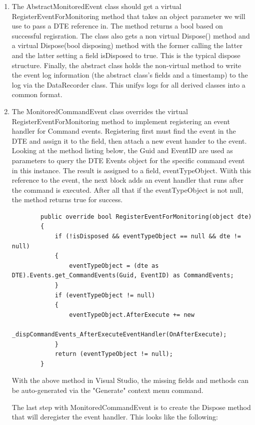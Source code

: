\begin{enumerate}
\item
The AbstractMonitoredEvent class should get a virtual RegisterEventForMonitoring method that takes an object parameter we will use to pass a DTE reference in.  The method returns a bool based on successful regisration.  The class also gets a non virtual Dispose() method  and a virtual Dispose(bool disposing) method with the former calling the latter and the latter setting a field isDisposed to true. This is the typical dispose structure.  Finally, the abstract class holds the non-virtual method to write the event log information (the abstract class's fields and a timestamp) to the log via the DataRecorder class.  This unifys logs for all derived classes into a common format.

\item
The MonitoredCommandEvent class overrides the virtual RegisterEventForMonitoring method to implement registering an event handler for Command events.  Registering first must find the event in the DTE and assign it to the field, then attach a new event hander to the event.  Looking at the method listing below, the Guid and EventID are used as parameters to query the DTE Events object for the specific command event in this instance.  The result is assigned to a field, eventTypeObject.  Wiith this reference to the event, the next block adds an event handler that runs after the command is executed.  After all that if the eventTypeObject is not null, the method returns true for success.
\begin{lstlisting}
        public override bool RegisterEventForMonitoring(object dte)
        {
            if (!isDisposed && eventTypeObject == null && dte != null)
            {
                eventTypeObject = (dte as DTE).Events.get_CommandEvents(Guid, EventID) as CommandEvents;
            }
            if (eventTypeObject != null)
            {
                eventTypeObject.AfterExecute += new 
			_dispCommandEvents_AfterExecuteEventHandler(OnAfterExecute);
            }
            return (eventTypeObject != null);
        }
\end{lstlisting}

With the above method in Visual Studio, the missing fields and methods can be auto-generated via the "Generate" context menu command.  

The last step with MonitoredCommandEvent is to create the Dispose method that will deregister the event handler. This looks like the following:


\end{enumerate}
